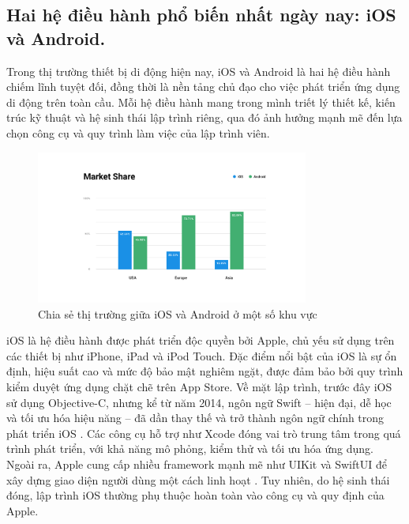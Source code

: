 \subsection{Hai hệ điều hành phổ biến nhất ngày nay: iOS và Android.}
\renewcommand{\labelitemi}{--}   
\begin{flushleft}
  \hspace*{0.8cm}Trong thị trường thiết bị di động hiện nay, iOS và Android là hai hệ điều hành chiếm lĩnh tuyệt đối, đồng thời là nền tảng chủ đạo cho việc phát triển ứng dụng di động trên toàn cầu. Mỗi hệ điều hành mang trong mình triết lý thiết kế, kiến trúc kỹ thuật và hệ sinh thái lập trình riêng, qua đó ảnh hưởng mạnh mẽ đến lựa chọn công cụ và quy trình làm việc của lập trình viên.
\end{flushleft}

\begin{figure}[h]
  \centering
  \includegraphics[width=0.8\textwidth]{images/Market Share.png}
  \caption{Chia sẻ thị trường giữa iOS và Android ở một số khu vực}
  \label{fig:fig}
\end{figure}
    \begin{flushleft}
        \hspace*{0.8cm}iOS là hệ điều hành được phát triển độc quyền bởi Apple, chủ yếu sử dụng trên các thiết bị như iPhone, iPad và iPod Touch. Đặc điểm nổi bật của iOS là sự ổn định, hiệu suất cao và mức độ bảo mật nghiêm ngặt, được đảm bảo bởi quy trình kiểm duyệt ứng dụng chặt chẽ trên App Store. Về mặt lập trình, trước đây iOS sử dụng Objective-C, nhưng kể từ năm 2014, ngôn ngữ Swift – hiện đại, dễ học và tối ưu hóa hiệu năng – đã dần thay thế và trở thành ngôn ngữ chính trong phát triển iOS \cite{swift}. Các công cụ hỗ trợ như Xcode đóng vai trò trung tâm trong quá trình phát triển, với khả năng mô phỏng, kiểm thử và tối ưu hóa ứng dụng. Ngoài ra, Apple cung cấp nhiều framework mạnh mẽ như UIKit và SwiftUI để xây dựng giao diện người dùng một cách linh hoạt \cite{swiftui}. Tuy nhiên, do hệ sinh thái đóng, lập trình iOS thường phụ thuộc hoàn toàn vào công cụ và quy định của Apple.
    \end{flushleft}

